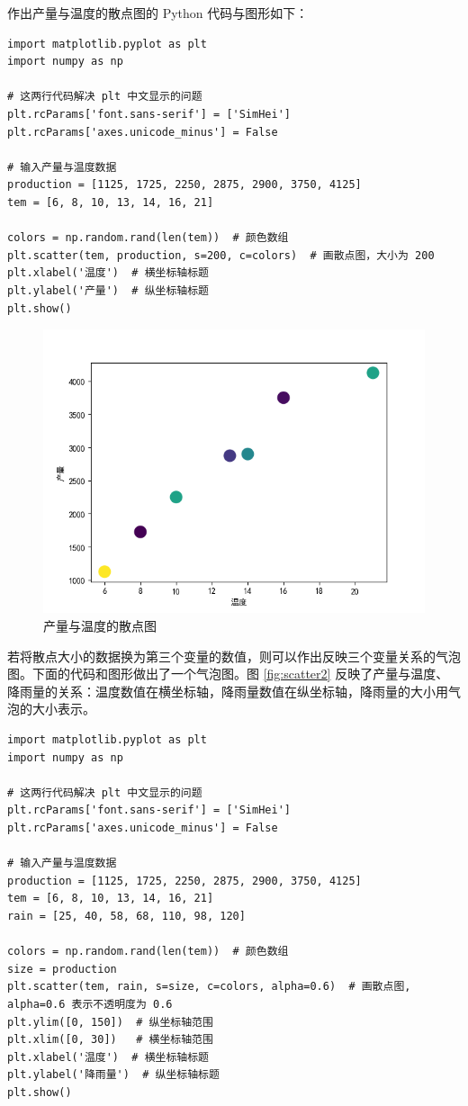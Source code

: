 作出产量与温度的散点图的 Python 代码与图形如下：
\begin{lstlisting}[Language=Python]
import matplotlib.pyplot as plt
import numpy as np

# 这两行代码解决 plt 中文显示的问题
plt.rcParams['font.sans-serif'] = ['SimHei']
plt.rcParams['axes.unicode_minus'] = False

# 输入产量与温度数据
production = [1125, 1725, 2250, 2875, 2900, 3750, 4125]
tem = [6, 8, 10, 13, 14, 16, 21]

colors = np.random.rand(len(tem))  # 颜色数组
plt.scatter(tem, production, s=200, c=colors)  # 画散点图，大小为 200
plt.xlabel('温度')  # 横坐标轴标题
plt.ylabel('产量')  # 纵坐标轴标题
plt.show()
\end{lstlisting}

\begin{figure}[!ht]
  \centering
  \includegraphics[scale=0.9]{figure/scatter1.png}
  \caption{产量与温度的散点图}
\end{figure}

若将散点大小的数据换为第三个变量的数值，则可以作出反映三个变量关系的气泡图。下面的代码和图形做出了一个气泡图。图 \ref{fig:scatter2} 反映了产量与温度、降雨量的关系：温度数值在横坐标轴，降雨量数值在纵坐标轴，降雨量的大小用气泡的大小表示。

\begin{lstlisting}[Language=Python]
import matplotlib.pyplot as plt
import numpy as np

# 这两行代码解决 plt 中文显示的问题
plt.rcParams['font.sans-serif'] = ['SimHei']
plt.rcParams['axes.unicode_minus'] = False

# 输入产量与温度数据
production = [1125, 1725, 2250, 2875, 2900, 3750, 4125]
tem = [6, 8, 10, 13, 14, 16, 21]
rain = [25, 40, 58, 68, 110, 98, 120]

colors = np.random.rand(len(tem))  # 颜色数组
size = production
plt.scatter(tem, rain, s=size, c=colors, alpha=0.6)  # 画散点图, alpha=0.6 表示不透明度为 0.6
plt.ylim([0, 150])  # 纵坐标轴范围
plt.xlim([0, 30])   # 横坐标轴范围
plt.xlabel('温度')  # 横坐标轴标题
plt.ylabel('降雨量')  # 纵坐标轴标题
plt.show()
\end{lstlisting}

